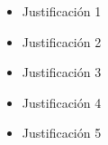 
\lipsum[4]

\begin{itemize}
  \item Justificación 1
  \item Justificación 2
  \item Justificación 3
  \item Justificación 4
  \item Justificación 5
\end{itemize}
